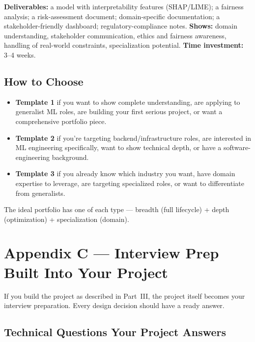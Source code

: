 \textbf{Deliverables:} a model with interpretability features (SHAP/LIME); a fairness analysis; a risk-assessment
document; domain-specific documentation; a stakeholder-friendly dashboard; regulatory-compliance notes.
\textbf{Shows:} domain understanding, stakeholder communication, ethics and fairness awareness, handling of
real-world constraints, specialization potential. \textbf{Time investment:} 3--4 weeks.

\subsection{How to Choose}

\begin{itemize}
  \item \textbf{Template 1} if you want to show complete understanding, are applying to generalist ML roles, are
  building your first serious project, or want a comprehensive portfolio piece.
  \item \textbf{Template 2} if you're targeting backend/infrastructure roles, are interested in ML engineering
  specifically, want to show technical depth, or have a software-engineering background.
  \item \textbf{Template 3} if you already know which industry you want, have domain expertise to leverage, are
  targeting specialized roles, or want to differentiate from generalists.
\end{itemize}

\begin{keytakeaway}
The ideal portfolio has one of each type --- breadth (full lifecycle) + depth (optimization) + specialization
(domain).
\end{keytakeaway}

\section{Appendix C --- Interview Prep Built Into Your Project}
\label{app:interview}

If you build the project as described in Part~III, the project itself becomes your interview preparation. Every
design decision should have a ready answer.

\subsection{Technical Questions Your Project Answers}

